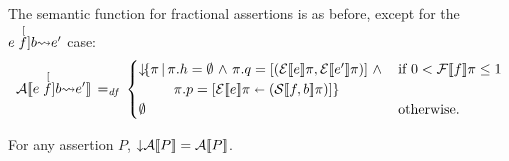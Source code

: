 \documentclass[11pt]{report}
\begin{document}
% 
% 
% 		
% 		
% 		
% 		
% 		
% 		
% 		
% 		
% 		
% 	
% 	
% 
% 


The semantic function for fractional assertions is as before, except for the $e \stackrel[f]{b}{\leadsto} e'$ case: \[ \dna{e \writeto{f}{b} e'} \eqdef \begin{cases}
				\down \lbrace\pi \,|\, \pi.h = \nil \conj \pi.q = \lsingle{(\dnexpr{e}\pi, \dnexpr{e'}\pi)} \conj & \text{if $0 < \dnfrac{f}\pi \leq 1$}\\ \mtab \mtab \mtab \pi.p = \funup{}{\ptup{\dnexpr{e}\pi}{(\dnshare{f,b}\pi)}}\rbrace &  \\
				\nil & \text{otherwise.}\end{cases}\]
			
\begin{lemma}[Closure]
	\label{lem:assertion-closure}
	For any assertion $P$, $\operatorname{\downarrow}\!\mathcal{A}[\![P]\!] = \mathcal{A}[\![P]\!]$. 
\end{lemma}
\end{document}

